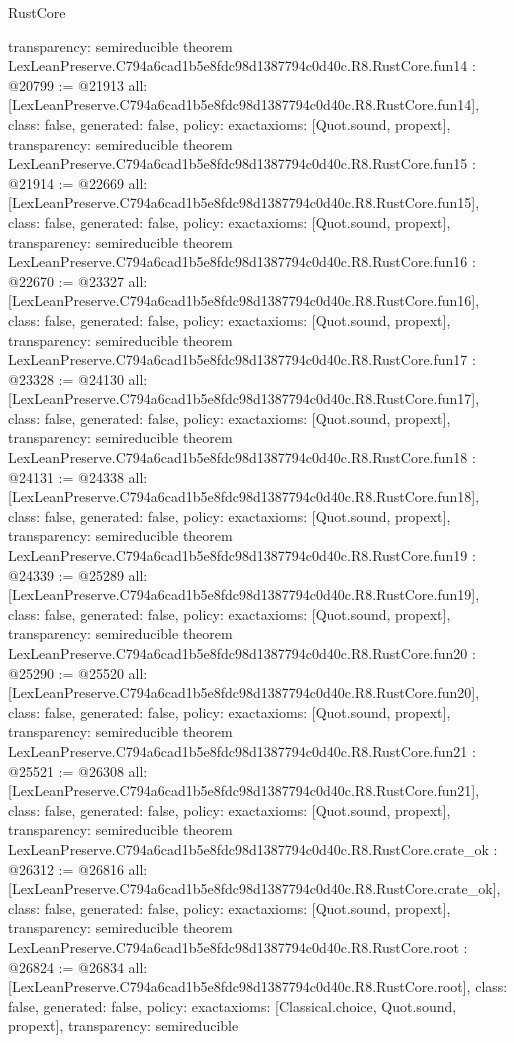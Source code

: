 \begin{lexlean}{RustCore}
\begin{coremodule}
{  transparency: semireducible
}
theorem LexLeanPreserve.C794a6cad1b5e8fdc98d1387794c0d40c.R8.RustCore.fun14 : @20799 := @21913 {
  all: [LexLeanPreserve.C794a6cad1b5e8fdc98d1387794c0d40c.R8.RustCore.fun14],
  class: false,
  generated: false,
  policy: exact{axioms: [Quot.sound, propext]},
  transparency: semireducible
}
theorem LexLeanPreserve.C794a6cad1b5e8fdc98d1387794c0d40c.R8.RustCore.fun15 : @21914 := @22669 {
  all: [LexLeanPreserve.C794a6cad1b5e8fdc98d1387794c0d40c.R8.RustCore.fun15],
  class: false,
  generated: false,
  policy: exact{axioms: [Quot.sound, propext]},
  transparency: semireducible
}
theorem LexLeanPreserve.C794a6cad1b5e8fdc98d1387794c0d40c.R8.RustCore.fun16 : @22670 := @23327 {
  all: [LexLeanPreserve.C794a6cad1b5e8fdc98d1387794c0d40c.R8.RustCore.fun16],
  class: false,
  generated: false,
  policy: exact{axioms: [Quot.sound, propext]},
  transparency: semireducible
}
theorem LexLeanPreserve.C794a6cad1b5e8fdc98d1387794c0d40c.R8.RustCore.fun17 : @23328 := @24130 {
  all: [LexLeanPreserve.C794a6cad1b5e8fdc98d1387794c0d40c.R8.RustCore.fun17],
  class: false,
  generated: false,
  policy: exact{axioms: [Quot.sound, propext]},
  transparency: semireducible
}
theorem LexLeanPreserve.C794a6cad1b5e8fdc98d1387794c0d40c.R8.RustCore.fun18 : @24131 := @24338 {
  all: [LexLeanPreserve.C794a6cad1b5e8fdc98d1387794c0d40c.R8.RustCore.fun18],
  class: false,
  generated: false,
  policy: exact{axioms: [Quot.sound, propext]},
  transparency: semireducible
}
theorem LexLeanPreserve.C794a6cad1b5e8fdc98d1387794c0d40c.R8.RustCore.fun19 : @24339 := @25289 {
  all: [LexLeanPreserve.C794a6cad1b5e8fdc98d1387794c0d40c.R8.RustCore.fun19],
  class: false,
  generated: false,
  policy: exact{axioms: [Quot.sound, propext]},
  transparency: semireducible
}
theorem LexLeanPreserve.C794a6cad1b5e8fdc98d1387794c0d40c.R8.RustCore.fun20 : @25290 := @25520 {
  all: [LexLeanPreserve.C794a6cad1b5e8fdc98d1387794c0d40c.R8.RustCore.fun20],
  class: false,
  generated: false,
  policy: exact{axioms: [Quot.sound, propext]},
  transparency: semireducible
}
theorem LexLeanPreserve.C794a6cad1b5e8fdc98d1387794c0d40c.R8.RustCore.fun21 : @25521 := @26308 {
  all: [LexLeanPreserve.C794a6cad1b5e8fdc98d1387794c0d40c.R8.RustCore.fun21],
  class: false,
  generated: false,
  policy: exact{axioms: [Quot.sound, propext]},
  transparency: semireducible
}
theorem LexLeanPreserve.C794a6cad1b5e8fdc98d1387794c0d40c.R8.RustCore.crate_ok : @26312 := @26816 {
  all: [LexLeanPreserve.C794a6cad1b5e8fdc98d1387794c0d40c.R8.RustCore.crate_ok],
  class: false,
  generated: false,
  policy: exact{axioms: [Quot.sound, propext]},
  transparency: semireducible
}
theorem LexLeanPreserve.C794a6cad1b5e8fdc98d1387794c0d40c.R8.RustCore.root : @26824 := @26834 {
  all: [LexLeanPreserve.C794a6cad1b5e8fdc98d1387794c0d40c.R8.RustCore.root],
  class: false,
  generated: false,
  policy: exact{axioms: [Classical.choice, Quot.sound, propext]},
  transparency: semireducible
}


\end{coremodule}
\end{lexlean}
